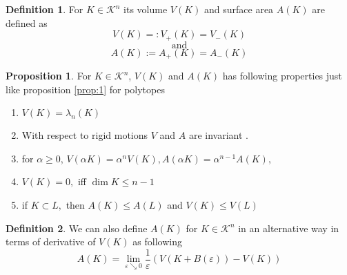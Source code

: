 \documentclass[oneside]{book}
\theoremstyle{definition}
\newtheorem{mydef}{Definition}[chapter]
\newtheorem{prop}{Proposition}
\begin{document}
 \begin{mydef}
 For $K \in \mathcal{K}^n$ its volume $V(K) $ and surface area $A(K)$ are defined as 
\[
  V(K) =: V_{+}(K)=V_{-}(K)
\]
$$\text{and} $$
\[
 A(K) :=  A_{+}(K) = A_{-}(K) 
\]
 
\end{mydef}
 \begin{prop}
 
For $ K \in \mathcal{K}^n $,  $V(K) $ and $A(K) $ has following properties just like proposition \ref{prop:1} for polytopes
\begin{enumerate}
    \item  $V(K)=\lambda_{n}(K)$
\item With respect to rigid motions $V$ and $A$ are invariant .
\item  for $\alpha \geq 0$, $V(\alpha K)=\alpha^{n} V(K), A(\alpha K)=\alpha^{n-1} A(K),$ 
\item $V(K)=0,$ iff $\operatorname{dim} K \leq n-1$
\item if $K \subset L,$ then  $A(K) \leq A(L)$ and $V(K) \leq V(L)$
\end{enumerate}
 \end{prop}
\begin{mydef}
We can also define $A(K)$ for $K \in \mathcal{K}^n$ in an alternative way in terms of derivative of $V(K)$ as following \\
\begin{equation}
\label{eq48}
A(K)=\lim _{\varepsilon \searrow 0} \frac{1}{\varepsilon}(V(K+B(\varepsilon))-V(K))
\end{equation}
\end{mydef}
\newpage
\end{document}
